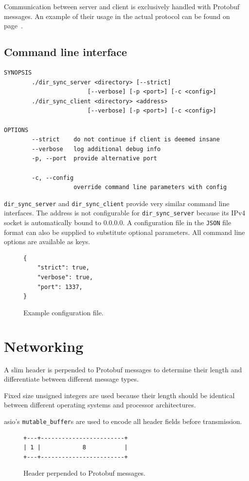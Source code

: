 \documentclass[a4paper]{article}
\begin{document}
Communication between server and client is exclusively handled with Protobuf messages. 
An example of their usage in the actual protocol can be found on page~\pageref{sec:phases}.
\newpage

\subsection{Command line interface}
\begin{verbatim}
SYNOPSIS
        ./dir_sync_server <directory> [--strict] 
        			    [--verbose] [-p <port>] [-c <config>]
        ./dir_sync_client <directory> <address>  
        			    [--verbose] [-p <port>] [-c <config>]

OPTIONS
        --strict    do not continue if client is deemed insane
        --verbose   log additional debug info
        -p, --port  provide alternative port

        -c, --config
                    override command line parameters with config
\end{verbatim}

\texttt{dir\_sync\_server} and \texttt{dir\_sync\_client} provide very similar command line interfaces. The address is not configurable for \texttt{dir\_sync\_server} because its IPv4 socket is automatically bound to 0.0.0.0. 
\bigbreak
A configuration file in the \texttt{JSON} file format can also be supplied to substitute optional parameters. All command line options are available as keys.

\begin{figure}[H]
\begin{verbatim}
{
	"strict": true,
	"verbose": true,
	"port": 1337,
}

\end{verbatim}
\caption{Example configuration file.}
\end{figure}

\section{Networking}
A slim header is perpended to Protobuf messages to determine their length and differentiate between different message types. 

Fixed size unsigned integers are used because their length should be identical between different operating systems and processor architectures. 

asio's \texttt{mutable\_buffer}s are used to encode all header fields before transmission.
\begin{figure}[H]
\centering
\begin{BVerbatim}
+---+------------------------+
| 1 |            8           |
+---+------------------------+
\end{BVerbatim}
\caption{Header perpended to Protobuf messages.}
\end{figure}
\end{document}
